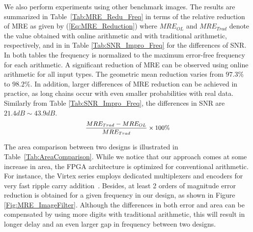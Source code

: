 \documentclass{acm_proc_article-sp}
\begin{document}
We also perform experiments using other benchmark images. The results are summarized in Table~\ref{Tab:MRE_Redu_Freq} in terms of the relative reduction of MRE as given by (\ref{Eq:MRE_Reduction}) where $MRE_{OL}$ and $MRE_{Trad}$ denote the value obtained with online arithmetic and with traditional arithmetic, respectively, and in in Table \ref{Tab:SNR_Impro_Freq} for the differences of SNR. In both tables the frequency is normalized to the maximum error-free frequency for each arithmetic. A significant reduction of MRE can be observed using online arithmetic for all input types. The geometric mean reduction varies from $97.3\%$ to $98.2\%$. In addition, larger differences of MRE reduction can be achieved in practice, as long chains occur with even smaller probabilities with real data. Similarly from Table \ref{Tab:SNR_Impro_Freq}, the differences in SNR are $21.4dB\sim43.9dB$.\vspace{1ex}
%
%
\begin{eqnarray}\label{Eq:MRE_Reduction}
\scriptsize
  \frac{MRE_{Trad}-MRE_{OL}}{MRE_{Trad}}\times100\%
\normalsize
\end{eqnarray}

The area comparison between two designs is illustrated in Table~\ref{Tab:AreaComparison}. While we notice that our approach comes at some increase in area, the FPGA architecture is optimized for conventional arithmetic. For instance, the Virtex series employs dedicated multiplexers and encoders for very fast ripple carry addition~\cite{Virtex6}. Besides, at least 2 orders of magnitude error reduction is obtained for a given frequency in our design, as shown in Figure \ref{Fig:MRE_ImageFilter}. Although the differences in both error and area can be compensated by using more digits with traditional arithmetic, this will result in longer delay and an even larger gap in frequency between two designs.
\end{document}
